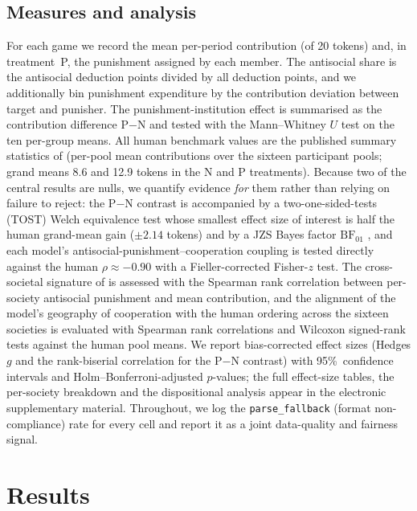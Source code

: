 \subsection{Measures and analysis}
For each game we record the mean per-period contribution (of 20 tokens) and, in treatment~P, the punishment assigned by each member. The antisocial share is the antisocial deduction points divided by all deduction points, and we additionally bin punishment expenditure by the contribution deviation between target and punisher. The punishment-institution effect is summarised as the contribution difference P$-$N and tested with the Mann--Whitney $U$ test on the ten per-group means. All human benchmark values are the published summary statistics of \textcite{herrmann2008antisocial} (per-pool mean contributions over the sixteen participant pools; grand means 8.6 and 12.9 tokens in the N and P treatments). Because two of the central results are nulls, we quantify evidence \emph{for} them rather than relying on failure to reject: the P$-$N contrast is accompanied by a two-one-sided-tests (TOST) Welch equivalence test \parencite{lakens2018equivalence} whose smallest effect size of interest is half the human grand-mean gain ($\pm 2.14$ tokens) and by a JZS Bayes factor $\mathrm{BF}_{01}$ \parencite{rouder2009bayesian}, and each model's antisocial-punishment--cooperation coupling is tested directly against the human $\rho\approx-0.90$ with a Fieller-corrected Fisher-$z$ test. The cross-societal signature of \textcite{herrmann2008antisocial} is assessed with the Spearman rank correlation between per-society antisocial punishment and mean contribution, and the alignment of the model's geography of cooperation with the human ordering across the sixteen societies is evaluated with Spearman rank correlations and Wilcoxon signed-rank tests against the human pool means. We report bias-corrected effect sizes (Hedges $g$ and the rank-biserial correlation for the P$-$N contrast) with 95\%\ confidence intervals and Holm--Bonferroni-adjusted $p$-values; the full effect-size tables, the per-society breakdown and the dispositional analysis appear in the electronic supplementary material. Throughout, we log the \texttt{parse\_fallback} (format non-compliance) rate for every cell and report it as a joint data-quality and fairness signal.

\section{Results}

